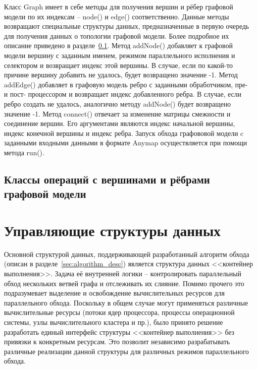 Класс \textsf{Graph} имеет в себе методы для получения вершин и рёбер графовой модели по их индексам -- \textsf{node()} и \textsf{edge()} соответственно. Данные методы возвращают специальные структуры данных, предназначенные в первую очередь для получения данных о топологии графовой модели. Более подробное их описание приведено в разделе~\ref{sec:operation_classes}. Метод \textsf{addNode()} добавляет к графовой модели вершину с заданным именем, режимом параллельного исполнения и селектором и возвращает индекс этой вершины. В случае, если по какой-то причине вершину добавить не удалось, будет возвращено значение -1. Метод \textsf{addEdge()} добавляет в графовую модель ребро с заданными обработчиком, пре- и пост- процессором и возвращает индекс добавленного ребра. В случае, если ребро создать не удалось, аналогично методу \textsf{addNode()} будет возвращено значение -1. Метод \textsf{connect()} отвечает за изменение матрицы смежности и соединение вершин. Его аргументами являются индекс начальной вершины, индекс конечной вершины и индекс ребра. Запуск обхода графововой модели c заданными входными данными в формате \textsf{Anymap} осуществляется при помощи метода \textsf{run()}.

\subsection{Классы операций с вершинами и рёбрами графовой модели}\label{sec:operation_classes}
\section{Управляющие структуры данных}
Основной структурой данных, поддерживающей разработанный алгоритм обхода (описан в разделе~\ref{sec:algorithm_desc}) является структура данных <<контейнер выполнения>>. Задача её внутренней логики -- контролировать параллельный обход нескольких ветвей графа и отслеживать их слияние. Помимо прочего это подразумевает выделение и освобождение вычислительных ресурсов для параллельного обхода. Поскольку в общем случае могут применяться различные вычислительные ресурсы (потоки ядер процессора, процессы операционной системы, узлы вычислительного кластера и пр.), было принято решение разработать единый интерфейс структуры <<контейнер выполнения>> без привязки к конкретным ресурсам. Это позволит независимо разрабатывать различные реализации данной структуры для различных режимов параллельного обхода.

